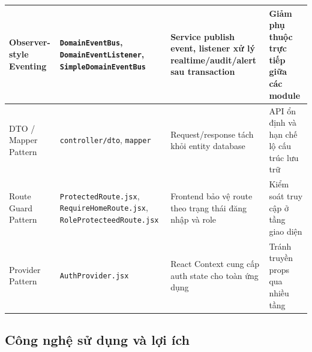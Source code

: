 {\begin{longtable}{|p{}|p{}|p{}|p{}|}
\hline
Observer-style Eventing & \texttt{DomainEventBus}, \texttt{DomainEventListener}, \texttt{SimpleDomainEventBus} & Service publish event, listener xử lý realtime/audit/alert sau transaction & Giảm phụ thuộc trực tiếp giữa các module \\
\hline
DTO / Mapper Pattern & \texttt{controller/dto}, \texttt{mapper} & Request/response tách khỏi entity database & API ổn định và hạn chế lộ cấu trúc lưu trữ \\
\hline
Route Guard Pattern & \texttt{ProtectedRoute.jsx}, \texttt{RequireHomeRoute.jsx}, \texttt{RoleProtecteedRoute.jsx} & Frontend bảo vệ route theo trạng thái đăng nhập và role & Kiểm soát truy cập ở tầng giao diện \\
\hline
Provider Pattern & \texttt{AuthProvider.jsx} & React Context cung cấp auth state cho toàn ứng dụng & Tránh truyền props qua nhiều tầng \\
\hline
\end{longtable}
}

\subsection{Công nghệ sử dụng và lợi ích}

